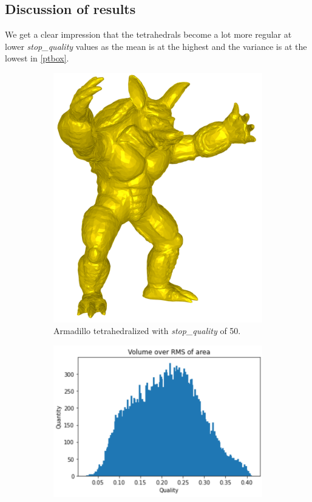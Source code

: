 \subsection{Discussion of results}
We get a clear impression that the tetrahedrals become a lot more regular at lower \textit{stop\_quality} values as the mean is at the highest and the variance is at the lowest in \autoref{ptbox}. 
\begin{figure}
	\centering
	\begin{subfigure}[b]{0.49\linewidth}
		\centering
		\includegraphics[height=0.75\linewidth]{Materials/E1/Armadillo50}
		\caption{Armadillo tetrahedralized with \textit{stop\_quality} of 50.}
	\end{subfigure}
	\hfill
	\begin{subfigure}[b]{0.49\linewidth}
		\centering
		\includegraphics[width=\linewidth]{Materials/E1/voa2}

\end{subfigure}
\end{figure}
